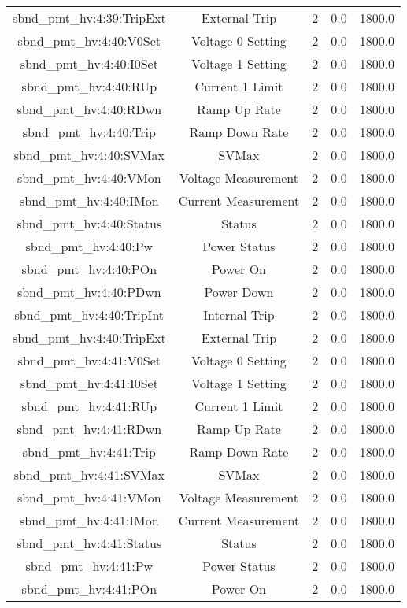 \begin{table}[ptb]
\begin{tabular}{c | c c c c}
sbnd_pmt_hv:4:39:TripExt & External Trip & 2 & 0.0 & 1800.0\\ 
sbnd_pmt_hv:4:40:V0Set & Voltage 0 Setting & 2 & 0.0 & 1800.0\\ 
sbnd_pmt_hv:4:40:I0Set & Voltage 1 Setting & 2 & 0.0 & 1800.0\\ 
sbnd_pmt_hv:4:40:RUp & Current 1 Limit & 2 & 0.0 & 1800.0\\ 
sbnd_pmt_hv:4:40:RDwn & Ramp Up Rate & 2 & 0.0 & 1800.0\\ 
sbnd_pmt_hv:4:40:Trip & Ramp Down Rate & 2 & 0.0 & 1800.0\\ 
sbnd_pmt_hv:4:40:SVMax & SVMax & 2 & 0.0 & 1800.0\\ 
sbnd_pmt_hv:4:40:VMon & Voltage Measurement & 2 & 0.0 & 1800.0\\ 
sbnd_pmt_hv:4:40:IMon & Current Measurement & 2 & 0.0 & 1800.0\\ 
sbnd_pmt_hv:4:40:Status & Status & 2 & 0.0 & 1800.0\\ 
sbnd_pmt_hv:4:40:Pw & Power Status & 2 & 0.0 & 1800.0\\ 
sbnd_pmt_hv:4:40:POn & Power On & 2 & 0.0 & 1800.0\\ 
sbnd_pmt_hv:4:40:PDwn & Power Down & 2 & 0.0 & 1800.0\\ 
sbnd_pmt_hv:4:40:TripInt & Internal Trip & 2 & 0.0 & 1800.0\\ 
sbnd_pmt_hv:4:40:TripExt & External Trip & 2 & 0.0 & 1800.0\\ 
sbnd_pmt_hv:4:41:V0Set & Voltage 0 Setting & 2 & 0.0 & 1800.0\\ 
sbnd_pmt_hv:4:41:I0Set & Voltage 1 Setting & 2 & 0.0 & 1800.0\\ 
sbnd_pmt_hv:4:41:RUp & Current 1 Limit & 2 & 0.0 & 1800.0\\ 
sbnd_pmt_hv:4:41:RDwn & Ramp Up Rate & 2 & 0.0 & 1800.0\\ 
sbnd_pmt_hv:4:41:Trip & Ramp Down Rate & 2 & 0.0 & 1800.0\\ 
sbnd_pmt_hv:4:41:SVMax & SVMax & 2 & 0.0 & 1800.0\\ 
sbnd_pmt_hv:4:41:VMon & Voltage Measurement & 2 & 0.0 & 1800.0\\ 
sbnd_pmt_hv:4:41:IMon & Current Measurement & 2 & 0.0 & 1800.0\\ 
sbnd_pmt_hv:4:41:Status & Status & 2 & 0.0 & 1800.0\\ 
sbnd_pmt_hv:4:41:Pw & Power Status & 2 & 0.0 & 1800.0\\ 
sbnd_pmt_hv:4:41:POn & Power On & 2 & 0.0 & 1800.0\\ 

\end{tabular}
\end{table}
